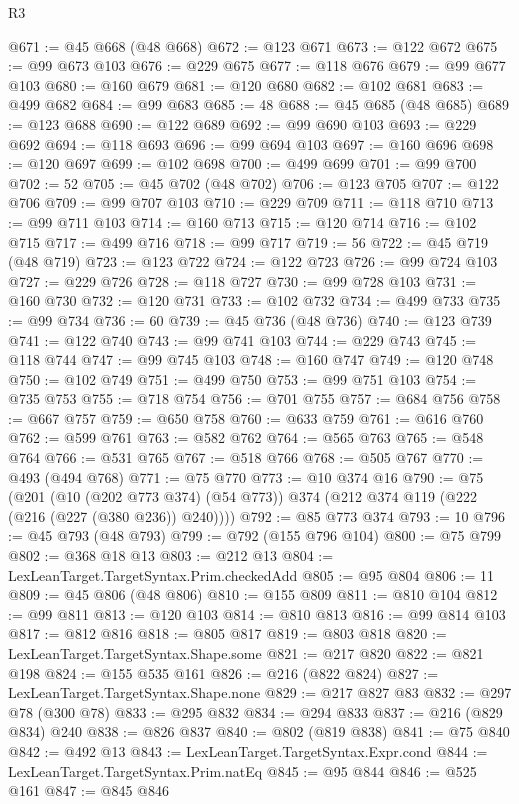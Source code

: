 \begin{lexlean}{R3}
\begin{coremodule}
@671 := @45 @668 (@48 @668)
@672 := @123 @671
@673 := @122 @672
@675 := @99 @673 @103
@676 := @229 @675
@677 := @118 @676
@679 := @99 @677 @103
@680 := @160 @679
@681 := @120 @680
@682 := @102 @681
@683 := @499 @682
@684 := @99 @683
@685 := 48
@688 := @45 @685 (@48 @685)
@689 := @123 @688
@690 := @122 @689
@692 := @99 @690 @103
@693 := @229 @692
@694 := @118 @693
@696 := @99 @694 @103
@697 := @160 @696
@698 := @120 @697
@699 := @102 @698
@700 := @499 @699
@701 := @99 @700
@702 := 52
@705 := @45 @702 (@48 @702)
@706 := @123 @705
@707 := @122 @706
@709 := @99 @707 @103
@710 := @229 @709
@711 := @118 @710
@713 := @99 @711 @103
@714 := @160 @713
@715 := @120 @714
@716 := @102 @715
@717 := @499 @716
@718 := @99 @717
@719 := 56
@722 := @45 @719 (@48 @719)
@723 := @123 @722
@724 := @122 @723
@726 := @99 @724 @103
@727 := @229 @726
@728 := @118 @727
@730 := @99 @728 @103
@731 := @160 @730
@732 := @120 @731
@733 := @102 @732
@734 := @499 @733
@735 := @99 @734
@736 := 60
@739 := @45 @736 (@48 @736)
@740 := @123 @739
@741 := @122 @740
@743 := @99 @741 @103
@744 := @229 @743
@745 := @118 @744
@747 := @99 @745 @103
@748 := @160 @747
@749 := @120 @748
@750 := @102 @749
@751 := @499 @750
@753 := @99 @751 @103
@754 := @735 @753
@755 := @718 @754
@756 := @701 @755
@757 := @684 @756
@758 := @667 @757
@759 := @650 @758
@760 := @633 @759
@761 := @616 @760
@762 := @599 @761
@763 := @582 @762
@764 := @565 @763
@765 := @548 @764
@766 := @531 @765
@767 := @518 @766
@768 := @505 @767
@770 := @493 (@494 @768)
@771 := @75 @770
@773 := @10 @374 @16
@790 := @75
    (@201
      (@10 (@202 @773 @374) (@54 @773))
      @374
      (@212 @374 @119 (@222 (@216 (@227 (@380 @236)) @240))))
@792 := @85 @773 @374
@793 := 10
@796 := @45 @793 (@48 @793)
@799 := @792 (@155 @796 @104)
@800 := @75 @799
@802 := @368 @18 @13
@803 := @212 @13
@804 := LexLeanTarget.TargetSyntax.Prim.checkedAdd
@805 := @95 @804
@806 := 11
@809 := @45 @806 (@48 @806)
@810 := @155 @809
@811 := @810 @104
@812 := @99 @811
@813 := @120 @103
@814 := @810 @813
@816 := @99 @814 @103
@817 := @812 @816
@818 := @805 @817
@819 := @803 @818
@820 := LexLeanTarget.TargetSyntax.Shape.some
@821 := @217 @820
@822 := @821 @198
@824 := @155 @535 @161
@826 := @216 (@822 @824)
@827 := LexLeanTarget.TargetSyntax.Shape.none
@829 := @217 @827 @83
@832 := @297 @78 (@300 @78)
@833 := @295 @832
@834 := @294 @833
@837 := @216 (@829 @834) @240
@838 := @826 @837
@840 := @802 (@819 @838)
@841 := @75 @840
@842 := @492 @13
@843 := LexLeanTarget.TargetSyntax.Expr.cond
@844 := LexLeanTarget.TargetSyntax.Prim.natEq
@845 := @95 @844
@846 := @525 @161
@847 := @845 @846

\end{coremodule}
\end{lexlean}
